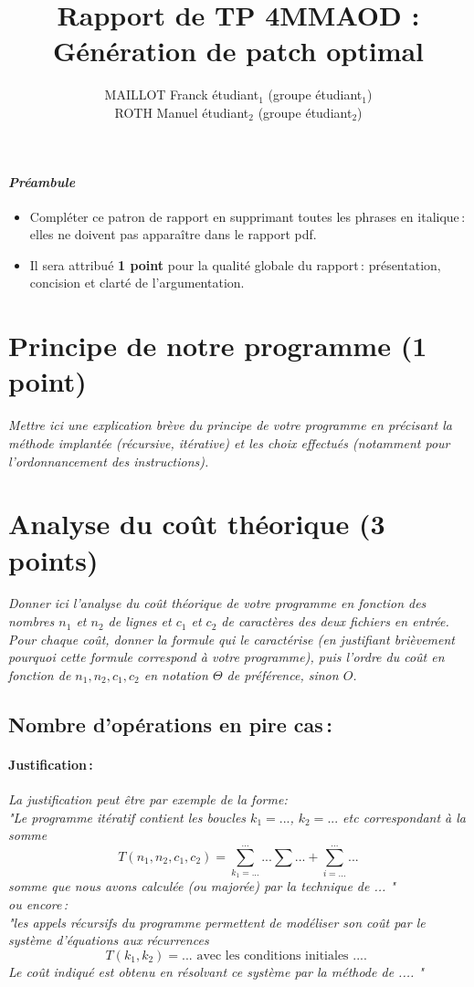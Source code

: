\documentclass[a4paper, 10pt, french]{article}
\title{Rapport de TP 4MMAOD : Génération de patch optimal}
\author{
MAILLOT Franck étudiant$_1$ (groupe étudiant$_1$) 
\\ ROTH Manuel étudiant$_2$ (groupe étudiant$_2$) 
}
\begin{document}
\maketitle

\paragraph{\em Préambule}
{\em \begin{itemize} 
   \item Compléter ce patron de rapport en supprimant toutes les phrases en italique\,: elles ne doivent pas apparaître dans le rapport pdf.
   \item Il sera attribué {\bf 1 point} pour la qualité globale du rapport\,: présentation, concision et clarté de l'argumentation.
\end{itemize}
}

\section{Principe de notre  programme (1 point)}
{\em Mettre ici une explication brève du principe de votre programme en  précisant la méthode implantée (récursive, itérative) et les
choix effectués (notamment pour l'ordonnancement des instructions).
} 

\section{Analyse du coût théorique (3 points)}
{\em Donner ici l'analyse du coût théorique de votre programme en fonction des nombres $n_1$ et $n_2$ de lignes 
et $c_1$ et $c_2$ de caractères des deux fichiers en entrée.
 Pour chaque coût, donner la formule qui le caractérise (en justifiant brièvement pourquoi cette formule correspond à votre programme), 
 puis l'ordre du coût en fonction de $n_1, n_2, c_1, c_2$ en notation $\Theta$ de préférence, sinon $O$.}

  \subsection{Nombre  d'opérations en pire cas\,: }
    \paragraph{Justification\,: }
    {\em La justification peut être par exemple de la forme: \\ 
       "Le programme itératif contient les boucles $k_1=...$, $k_2= ...$ etc correspondant à la somme 
      $$T(n_1, n_2, c_1, c_2) = \sum_{k_1=...}^{...} ... \sum ... + \sum_{i=...}^{...} ...$$ 
      somme que nous avons calculée (ou majorée) par la technique de  ... " \\
      ou  encore\,:  \\
      "les appels récursifs du programme permettent de modéliser son coût par le système d'équations aux récurrences 
      $$T(k_1, k_2) = ...  \mbox{~avec~les~conditions~initiales~....~} $$
      Le coût indiqué est obtenu en résolvant ce système par la méthode de  .... "
    } 
\end{document}

